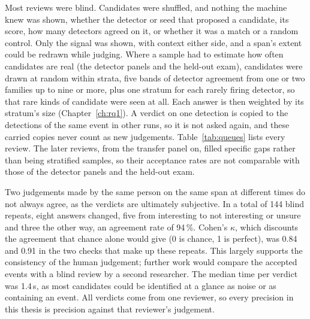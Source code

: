 Most reviews were blind. Candidates were shuffled, and nothing the machine knew was shown, whether the detector or seed that proposed a candidate, its score, how many detectors agreed on it, or whether it was a match or a random control. Only the signal was shown, with context either side, and a span's extent could be redrawn while judging. Where a sample had to estimate how often candidates are real (the detector panels and the held-out exam), candidates were drawn at random within strata, five bands of detector agreement from one or two families up to nine or more, plus one stratum for each rarely firing detector, so that rare kinds of candidate were seen at all. Each answer is then weighted by its stratum's size (Chapter~\ref{ch:rq1}). A verdict on one detection is copied to the detections of the same event in other runs, so it is not asked again, and these carried copies never count as new judgements. Table~\ref{tab:queues} lists every review. The later reviews, from the transfer panel on, filled specific gaps rather than being stratified samples, so their acceptance rates are not comparable with those of the detector panels and the held-out exam.

Two judgements made by the same person on the same span at different times do not always agree, as the verdicts are ultimately subjective. In a total of 144 blind repeats, eight answers changed, five from interesting to not interesting or unsure and three the other way, an agreement rate of 94\,\%. Cohen's $\kappa$, which discounts the agreement that chance alone would give (0 is chance, 1 is perfect), was 0.84 and 0.91 in the two checks that make up these repeats. This largely supports the consistency of the human judgement; further work would compare the accepted events with a blind review by a second researcher. The median time per verdict was 1.4\,s, as most candidates could be identified at a glance as noise or as containing an event. All verdicts come from one reviewer, so every precision in this thesis is precision against that reviewer's judgement.

